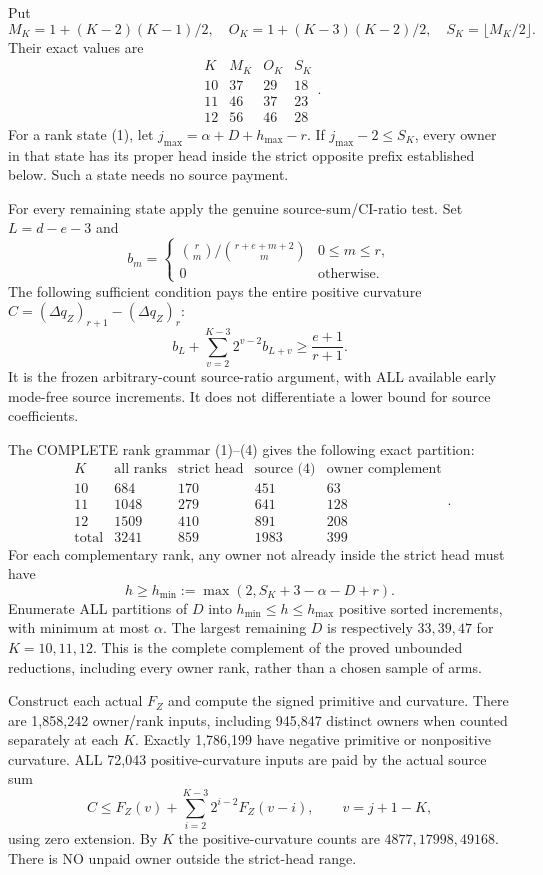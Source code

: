 \documentclass[11pt]{article}
\begin{document}
Put
\[
 M_K=1+(K-2)(K-1)/2,\quad O_K=1+(K-3)(K-2)/2,
 \quad S_K=\lfloor M_K/2\rfloor.
\]
Their exact values are
\[
\begin{array}{c|rrr}K&M_K&O_K&S_K\\\hline
10&37&29&18\\11&46&37&23\\12&56&46&28
\end{array}.                                             \tag{3}
\]
For a rank state (1), let $j_{\max}=\alpha+D+h_{\max}-r$.
If $j_{\max}-2\le S_K$, every owner in that state has its proper
head inside the strict opposite prefix established below. Such a state
needs no source payment.

For every remaining state apply the genuine source-sum/CI-ratio test.
Set $L=d-e-3$ and
\[
 b_m=\begin{cases}
 \binom r m/\binom{r+e+m+2}m&0\le m\le r,\\0&\text{otherwise}.
 \end{cases}
\]
The following sufficient condition pays the entire positive curvature
$C=(\Delta q_Z)_{r+1}-(\Delta q_Z)_r$:
\[
             b_L+\sum_{v=2}^{K-3}2^{v-2}b_{L+v}
                           \ge\frac{e+1}{r+1}.          \tag{4}
\]
It is the frozen arbitrary-count source-ratio argument, with ALL
available early mode-free source increments. It does not differentiate
a lower bound for source coefficients.

The COMPLETE rank grammar (1)--(4) gives the following exact partition:
\[
\begin{array}{c|rrrr}
 K&\text{all ranks}&\text{strict head}&\text{source (4)}&\text{owner complement}\\\hline
10&684&170&451&63\\
11&1048&279&641&128\\
12&1509&410&891&208\\\hline
\text{total}&3241&859&1983&399
\end{array}.                                             \tag{5}
\]
For each complementary rank, any owner not already inside the strict
head must have
\[
 h\ge h_{\min}:=\max(2,S_K+3-\alpha-D+r).              \tag{6}
\]
Enumerate ALL partitions of $D$ into $h_{\min}\le h\le h_{\max}$
positive sorted increments, with minimum at most $\alpha$.
The largest remaining $D$ is respectively $33,39,47$ for $K=10,11,12$.
This is the complete complement of the proved unbounded reductions,
including every owner rank, rather than a chosen sample of arms.

Construct each actual $F_Z$ and compute the signed primitive and curvature.
There are 1,858,242 owner/rank inputs, including 945,847 distinct owners
when counted separately at each $K$. Exactly 1,786,199 have negative
primitive or nonpositive curvature. ALL 72,043 positive-curvature inputs
are paid by the actual source sum
\[
 C\le F_Z(v)+\sum_{i=2}^{K-3}2^{i-2}F_Z(v-i),
                  \qquad v=j+1-K,                       \tag{7}
\]
using zero extension. By $K$ the positive-curvature counts are
$4877,17998,49168$. There is NO unpaid owner outside the strict-head range.
\end{document}
